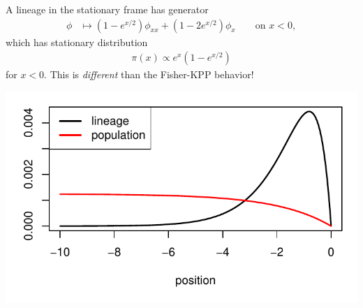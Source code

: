 \documentclass[fontscale=0.38,a0paper]{baposter}
\begin{document}
\begin{poster}
{A lineage in the stationary frame has generator
$$\begin{aligned}
    \phi 
    &\mapsto 
    \left(1 - e^{x/2}\right) \phi_{xx}
            + \left(1 - 2 e^{x/2}\right) \phi_x \qquad \text{on } x < 0,
\end{aligned}$$
which has stationary distribution 
$$\begin{aligned}
    \pi(x) \propto e^x \left(1 - e^{x/2}\right)
\end{aligned}$$
for $x < 0$.
This is \emph{different} than the Fisher-KPP behavior!

\includegraphics[width=\textwidth]{figs/pme_dists}

}





\end{poster}%
\end{document}
